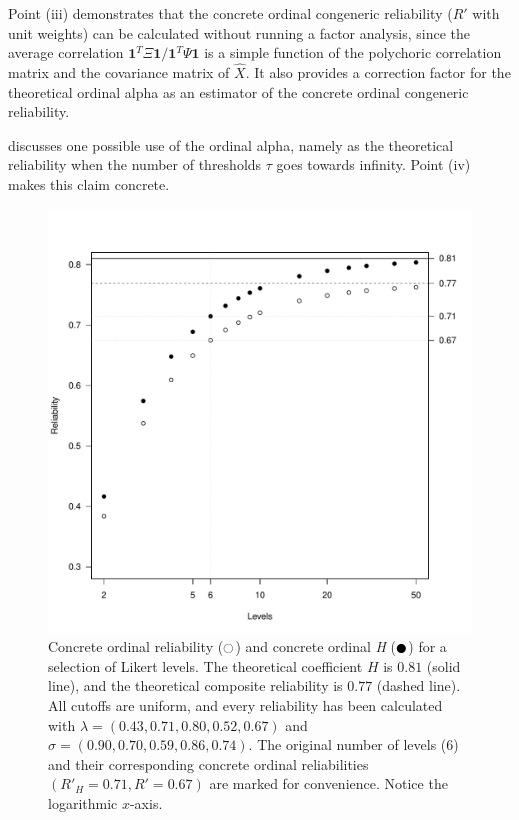 \documentclass[twoside]{article}
\begin{document}
Point (iii) demonstrates that the concrete ordinal congeneric reliability ($ R'$ with unit weights) can be
calculated without running a factor analysis, since the average correlation
$\boldsymbol{1}^{T}\Xi\boldsymbol{1}/\boldsymbol{1}^{T}\Psi\boldsymbol{1}$ is a simple
function of the polychoric correlation matrix and the covariance matrix
of $\hat{X}.$ It also provides a correction factor for the theoretical ordinal alpha as an estimator of the concrete ordinal congeneric reliability.

\citet[p. 1068]{Chalmers2018-fj} discusses one possible use of the
ordinal alpha, namely as the theoretical reliability when the number
of thresholds $\tau$ goes towards infinity. Point (iv) makes this
claim concrete.


\begin{figure}
\noindent \begin{centering}
\includegraphics[scale=0.5]{chunks/ordinals}
\par\end{centering}
\caption{\label{fig:Ordinal reliability}Concrete ordinal reliability ($\fullmoon$)
and concrete ordinal \textit{H} ($\newmoon$) for a selection of Likert levels. The
theoretical coefficient $H$ is $0.81$ (solid line), and the theoretical
composite reliability is $0.77$ (dashed line). All cutoffs are uniform,
and every reliability has been calculated with $\lambda=(0.43,0.71,0.80,0.52,0.67)$
and $\sigma=(0.90,0.70,0.59,0.86,0.74)$. The original number of levels
($6$) and their corresponding concrete ordinal reliabilities $( R'_{H}=0.71, R'=0.67)$
are marked for convenience. Notice the logarithmic $x$-axis.}
\end{figure}
\end{document}
